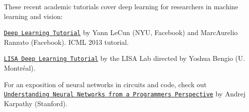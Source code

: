 These recent academic tutorials cover deep learning for researchers in machine learning and vision\+:


\begin{DoxyItemize}
\item \href{http://www.cs.nyu.edu/~yann/talks/lecun-ranzato-icml2013.pdf}{\tt Deep Learning Tutorial} by Yann Le\+Cun (N\+YU, Facebook) and Marc\textquotesingle{}Aurelio Ranzato (Facebook). I\+C\+ML 2013 tutorial.
\item \href{http://deeplearning.net/tutorial/deeplearning.pdf}{\tt L\+I\+SA Deep Learning Tutorial} by the L\+I\+SA Lab directed by Yoshua Bengio (U. Montréal).
\end{DoxyItemize}

For an exposition of neural networks in circuits and code, check out \href{http://karpathy.github.io/neuralnets/}{\tt Understanding Neural Networks from a Programmer\textquotesingle{}s Perspective} by Andrej Karpathy (Stanford). 